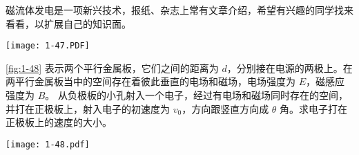 \begin{Exercise}
\begin{question}
  磁流体发电是一项新兴技术，报纸、杂志上常有文章介绍，希望有兴趣的同学找来看看，以扩展自己的知识面。
  \begin{figurehere}
    \begin{minipage}{\linewidth}\centering
      \texttt{[image: 1-47.PDF]}
      \caption{}\label{fig:1-47}
    \end{minipage}
  \end{figurehere}
  \item \cref{fig:1-48} 表示两个平行金属板，它们之间的距离为 $d$，分别接在电源的两极上。在两平行金属板当中的空间存在着彼此垂直的电场和磁场，电场强度为 $E$，磁感应强度为 $B$。 从负极板的小孔射入一个电子，经过有电场和磁场同时存在的空间，并打在正极板上，射入电子的初速度为 $v_0$，方向跟竖直方向成 $\theta$ 角。求电子打在正极板上的速度的大小。
  \begin{figurehere}
    \begin{minipage}{\linewidth}\centering
      \texttt{[image: 1-48.pdf]}
      \caption{}\label{fig:1-48}
    \end{minipage}
  \end{figurehere}
\end{question}
\end{Exercise}